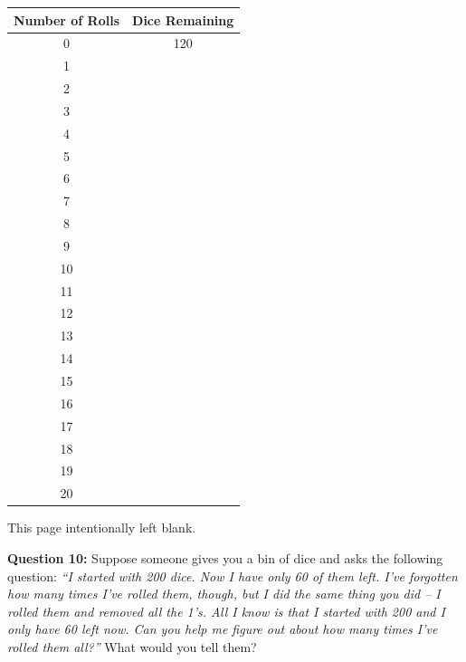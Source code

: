 \documentclass[11pt]{article}
\begin{document}
\begin{center}
\begin{tabular}{|c|c|}
\hline
Number of Rolls & Dice Remaining \\ \hline
0               & 120            \\ \hline
1               &                \\ \hline
2               &                \\ \hline
3               &                \\ \hline
4               &                \\ \hline
5               &                \\ \hline
6               &                \\ \hline
7               &                \\ \hline
8               &                \\ \hline
9               &                \\ \hline
10              &                \\ \hline
11              &                \\ \hline
12              &                \\ \hline
13              &                \\ \hline
14              &                \\ \hline
15              &                \\ \hline
16              &                \\ \hline
17              &                \\ \hline
18              &                \\ \hline
19              &                \\ \hline
20              &                \\ \hline
\end{tabular}
\end{center}
\newpage
\begin{center}
\normalsize
This page intentionally left blank.
\end{center}
\newpage
\normalsize
{\bf Question 10:} Suppose someone gives you a bin of dice and asks the following question: {\it ``I started with 200 dice. 
Now I have only 60 of them left. I've forgotten how many times I've rolled them, though, but I did the same thing you did -- I rolled
them and removed all the 1's. All I know is that I started with 200 and I only have 60 left now. Can you help me figure out about how many times I've rolled them all?''} 
What would you tell them?
\end{document}
